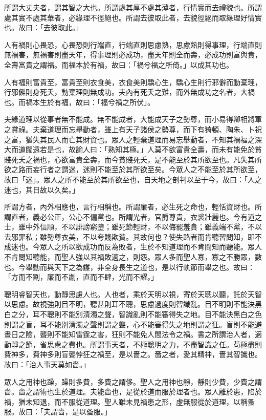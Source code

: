 \begin{pinyinscope}
所謂大丈夫者，謂其智之大也。所謂處其厚不處其薄者，行情實而去禮貌也。所謂處其實不處其華者，必緣理不徑絕也。所謂去彼取此者，去貌徑絕而取緣理好情實也。故曰：「去彼取此。」

人有禍則心畏恐，心畏恐則行端直，行端直則思慮熟，思慮熟則得事理，行端直則無禍害，無禍害則盡天年，得事理則必成功，盡天年則全而壽，必成功則富與貴，全壽富貴之謂福。而福本於有禍，故曰：「禍兮福之所倚。」以成其功也。

人有福則富貴至，富貴至則衣食美，衣食美則驕心生，驕心生則行邪僻而動棄理，行邪僻則身死夭，動棄理則無成功。夫內有死夭之難，而外無成功之名者，大禍也。而禍本生於有福，故曰：「福兮禍之所伏」。

夫緣道理以從事者無不能成。無不能成者，大能成天子之勢尊，而小易得卿相將軍之賞祿。夫棄道理而忘舉動者，雖上有天子諸侯之勢尊，而下有猗頓、陶朱、卜祝之富，猶失其民人而亡其財資也。眾人之輕棄道理而易忘舉動者，不知其禍福之深大而道闊遠若是也，故諭人曰：「熟知其極。」人莫不欲富貴全壽，而未有能免於貧賤死夭之禍也，心欲富貴全壽，而今貧賤死夭，是不能至於其所欲至也。凡失其所欲之路而妄行者之謂迷，迷則不能至於其所欲至矣。今眾人之不能至於其所欲至，故曰「迷」。眾人之所不能至於其所欲至也，自天地之剖判以至于今，故曰：「人之迷也，其日故以久矣。」

所謂方者，內外相應也，言行相稱也。所謂廉者，必生死之命也，輕恬資財也。所謂直者，義必公正，公心不偏黨也。所謂光者，官爵尊貴，衣裘壯麗也。今有道之士，雖中外信順，不以誹謗窮墮；雖死節輕財，不以侮罷羞貪；雖義端不黨，不以去邪罪私；雖勢尊衣美，不以夸賤欺貧。其故何也？使失路者而肯聽習問知，即不成迷也。今眾人之所以欲成功而反為敗者，生於不知道理而不肯問知而聽能。眾人不肯問知聽能，而聖人強以其禍敗適之，則怨。眾人多而聖人寡，寡之不勝眾，數也。今舉動而與天下之為讎，非全身長生之道也，是以行軌節而舉之也。故曰：「方而不割，廉而不劌，直而不肆，光而不耀。」

聰明睿智天也，動靜思慮人也。人也者，乘於天明以視，寄於天聰以聽，託於天智以思慮。故視強則目不明，聽甚則耳不聰，思慮過度則智識亂。目不明則不能決黑白之分，耳不聰則不能別清濁之聲，智識亂則不能審得失之地。目不能決黑白之色則謂之盲，耳不能別清濁之聲則謂之聾，心不能審得失之地則謂之狂。盲則不能避晝日之險，聾則不能知雷霆之害，狂則不能免人間法令之禍。書之所謂治人者，適動靜之節，省思慮之費也。所謂事天者，不極聰明之力，不盡智識之任。苟極盡則費神多，費神多則盲聾悖狂之禍至，是以嗇之。嗇之者，愛其精神，嗇其智識也。故曰：「治人事天莫如嗇。」

眾人之用神也躁，躁則多費，多費之謂侈。聖人之用神也靜，靜則少費，少費之謂嗇。嗇之謂術也生於道理。夫能嗇也，是從於道而服於理者也。眾人離於患，陷於禍，猶未知退，而不服從道理。聖人雖未見禍患之形，虛無服從於道理，以稱蚤服。故曰：「夫謂嗇，是以蚤服。」


\end{pinyinscope}
